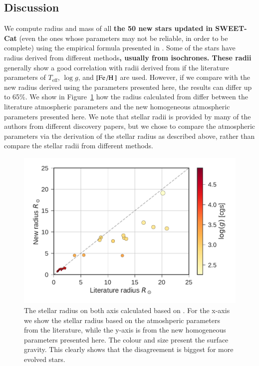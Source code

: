 \documentclass{aa}
\begin{document}
\subsection{Discussion}
\label{sec:Discussion}
We compute radius and mass of all {\bf the 50 new stars updated in SWEET-Cat}
(even the ones whose parameters may not be reliable, in order to be complete)
using the empirical formula presented in \citet{Torres2010}. Some of the stars
have radius derived from different methods{\bf , usually from isochrones. These
radii} generally show a good correlation with radii derived from
\citet{Torres2010} if the literature parameters of $T_\mathrm{eff}$, $\log g$,
and $[\ion{Fe}/\ion{H}]$ are used. However, if we compare with the new radius
derived using the parameters presented here, the results can differ up to 65\%.
We show in Figure~\ref{fig:RR} how the radius calculated from \citet{Torres2010}
differ between the literature atmospheric parameters and the new homogeneous
atmospheric parameters presented here. We note that stellar radii is provided by
many of the authors from different discovery papers, but we chose to compare the
atmospheric parameters via the derivation of the stellar radius as described
above, rather than compare the stellar radii from different methods.

\begin{figure}[tpb]
    \centering
    \includegraphics[width=1.0\linewidth]{figures/radiusVSradius.pdf}
    \caption{The stellar radius on both axis calculated based on \citet{Torres2010}.
    For the x-axis we show the stellar radius based on the atmoshperic parameters
    from the literature, while the y-axis is from the new homogeneous parameters
    presented here. The colour and size present the surface gravity. This clearly
    shows that the disagreement is biggest for more evolved stars.}
    \label{fig:RR}
\end{figure}
\end{document}
